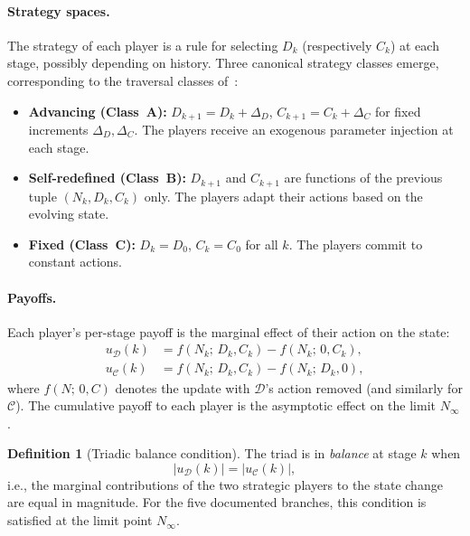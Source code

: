 \documentclass[12pt]{article}
\theoremstyle{definition}
\newtheorem{definition}[theorem]{Definition}
\theoremstyle{remark}
\begin{document}
\paragraph{Strategy spaces.}
The strategy of each player is a rule for selecting $D_k$ (respectively $C_k$) at each
stage, possibly depending on history.  Three canonical strategy classes emerge,
corresponding to the traversal classes of~\cite{Mil26a}:
\begin{itemize}
\item \textbf{Advancing (Class~A):} $D_{k+1} = D_k + \Delta_D$,
      $C_{k+1} = C_k + \Delta_C$ for fixed increments $\Delta_D, \Delta_C$.
      The players receive an exogenous parameter injection at each stage.
\item \textbf{Self-redefined (Class~B):} $D_{k+1}$ and $C_{k+1}$ are functions of the
      previous tuple $(N_k, D_k, C_k)$ only.
      The players adapt their actions based on the evolving state.
\item \textbf{Fixed (Class~C):} $D_k = D_0$, $C_k = C_0$ for all $k$.
      The players commit to constant actions.
\end{itemize}

\paragraph{Payoffs.}
Each player's per-stage payoff is the marginal effect of their action on the state:
\begin{align*}
  u_{\mathcal{D}}(k) &= f(N_k;\, D_k, C_k) - f(N_k;\, 0, C_k),\\
  u_{\mathcal{C}}(k) &= f(N_k;\, D_k, C_k) - f(N_k;\, D_k, 0),
\end{align*}
where $f(N;\, 0, C)$ denotes the update with $\mathcal{D}$'s action removed (and
similarly for $\mathcal{C}$).  The cumulative payoff to each player is the asymptotic
effect on the limit $N_\infty$.

\begin{definition}[Triadic balance condition]
\label{def:balance}
The triad is in \emph{balance} at stage $k$ when
\[
  \lvert u_{\mathcal{D}}(k) \rvert = \lvert u_{\mathcal{C}}(k) \rvert,
\]
i.e., the marginal contributions of the two strategic players to the state change are
equal in magnitude.  For the five documented branches, this condition is satisfied at
the limit point $N_\infty$.
\end{definition}

\end{document}

